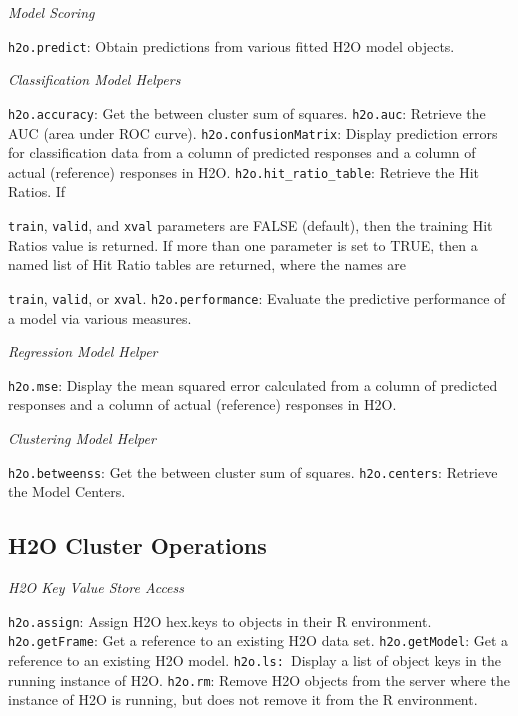 {\emph{Model Scoring}\par
{\texttt{h2o.predict}}: Obtain predictions from various fitted H2O model objects.\newline

\emph{Classification Model Helpers}\par
{\texttt{h2o.accuracy}}: Get the between cluster sum of squares.\newline
{\texttt{h2o.auc}}: Retrieve the AUC (area under ROC curve).\newline
{\texttt{h2o.confusionMatrix}}: Display prediction errors for classification data from a column of predicted responses and a column of actual (reference) responses in H2O.\newline
{\texttt{h2o.hit\_ratio\_table}}: Retrieve the Hit Ratios. If {\texttt{train}, {\texttt{valid}}, and {\texttt{xval}} parameters are FALSE (default), then the training Hit Ratios value is returned. If more than one parameter is set to TRUE, then a named list
of Hit Ratio tables are returned, where the names are {\texttt{train}, {\texttt{valid}}, or {\texttt{xval}}.\newline
{\texttt{h2o.performance}}: Evaluate the predictive performance of a model via various measures.\newline

\emph{Regression Model Helper}\par
{\texttt{h2o.mse}}: Display the mean squared error calculated from a column of predicted responses and a column of actual (reference) responses in H2O.\newline

\emph{Clustering Model Helper}\par
{\texttt{h2o.betweenss}}: Get the between cluster sum of squares.\newline
{\texttt{h2o.centers}}: Retrieve the Model Centers.\newline

\subsection{H2O Cluster Operations}
\emph{H2O Key Value Store Access}\par
{\texttt{h2o.assign}}: Assign H2O hex.keys to objects in their R environment.\newline
{\texttt{h2o.getFrame}}: Get a reference to an existing H2O data set. \newline
{\texttt{h2o.getModel}}: Get a reference to an existing H2O model. \newline
{\texttt{h2o.ls: }}Display a list of object keys in the running instance of H2O. \newline
{\texttt{h2o.rm}}: Remove H2O objects from the server where the instance of H2O is running, but does not remove it from the R environment.\newline

}}}

